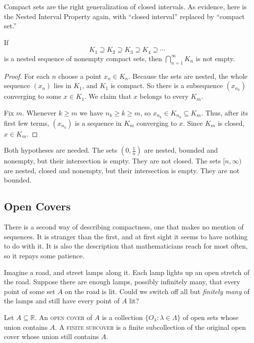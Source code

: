 Compact sets are the right generalization of closed intervals.  As evidence, here is the Nested Interval Property again, with ``closed interval'' replaced by ``compact set.''

\begin{theorem}\label{thm:nested-compact}
If
\[ K_1 \supseteq K_2 \supseteq K_3 \supseteq K_4 \supseteq \cdots \]
is a nested sequence of nonempty compact sets, then $\bigcap_{n=1}^{\infty} K_n$ is not empty.
\end{theorem}

\begin{proof}
For each $n$ choose a point $x_n \in K_n$.  Because the sets are nested, the whole sequence $(x_n)$ lies in $K_1$, and $K_1$ is compact.  So there is a subsequence $(x_{n_k})$ converging to some $x \in K_1$.  We claim that $x$ belongs to every $K_m$.

Fix $m$.  Whenever $k \geq m$ we have $n_k \geq k \geq m$, so $x_{n_k} \in K_{n_k} \subseteq K_m$.  Thus, after its first few terms, $(x_{n_k})$ is a sequence in $K_m$ converging to $x$.  Since $K_m$ is closed, $x \in K_m$.
\end{proof}

Both hypotheses are needed.  The sets $\left(0, \frac1n\right)$ are nested, bounded and nonempty, but their intersection is empty.  They are not closed.  The sets $[n, \infty)$ are nested, closed and nonempty, but their intersection is empty.  They are not bounded.

\subsection{Open Covers}

There is a second way of describing compactness, one that makes no mention of sequences.  It is stranger than the first, and at first sight it seems to have nothing to do with it.  It is also the description that mathematicians reach for most often, so it repays some patience.

Imagine a road, and street lamps along it.  Each lamp lights up an open stretch of the road.  Suppose there are enough lamps, possibly infinitely many, that every point of some set $A$ on the road is lit.  Could we switch off all but \emph{finitely many} of the lamps and still have every point of $A$ lit?

\begin{definition}
Let $A \subseteq \mathbb{R}$.  An \textsc{open cover} of $A$ is a collection $\{O_{\lambda} : \lambda \in \Lambda\}$ of open sets whose union contains $A$.  A \textsc{finite subcover} is a finite subcollection of the original open cover whose union still contains $A$.
\end{definition}

